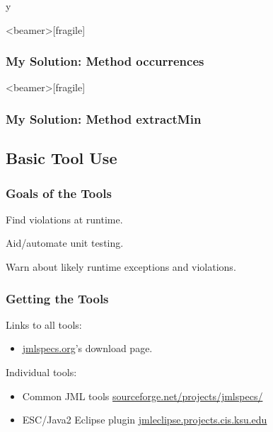 \if y\MAKEHANDOUTS \documentclass[t,compress,landscape,handout]{beamer}
\begin{document}
\begin{frame}<beamer>[fragile]
\frametitle{My Solution: Method occurrences}


\end{frame}

\begin{frame}<beamer>[fragile]
\frametitle{My Solution: Method extractMin}


\end{frame}


\subsection[Tools]{Basic Tool Use}  %

\begin{frame}
\frametitle{Goals of the Tools}
\begin{description}
\item[jmlc:]
Find violations at runtime.

\item[jmlunit:]
Aid/automate unit testing.

\item[ESC/Java2:]
Warn about likely runtime exceptions and violations.
\end{description}
\end{frame}

\begin{frame}
\frametitle{Getting the Tools}

Links to all tools:
\begin{itemize}
\item
\href{http://www.jmlspecs.org/}{jmlspecs.org}'s download page.
\end{itemize}


Individual tools:
\begin{itemize}
\item
Common JML tools
\href{http://sourceforge.net/projects/jmlspecs/}{sourceforge.net/projects/jmlspecs/}

\item
ESC/Java2 Eclipse plugin \newline
\href{http://jmleclipse.projects.cis.ksu.edu}{jmleclipse.projects.cis.ksu.edu}
\end{itemize}
\end{frame}
\end{document}

